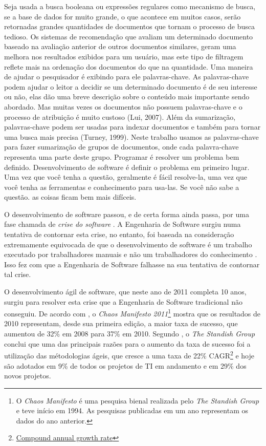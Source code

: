 Seja usada a busca booleana ou expressões regulares como mecanismo de busca, se a base de dados for muito grande, o que acontece em muitos casos, serão retornadas grandes quantidades de documentos que tornam o processo de busca tedioso. Os sistemas de recomendação que avaliam um determinado documento baseado na avaliação anterior de outros documentos similares, geram uma melhora nos resultados exibidos para um usuário, mas este tipo de filtragem reflete mais na ordenação dos documentos do que na quantidade. Uma maneira de ajudar o pesquisador é exibindo para ele palavras-chave.
As palavras-chave podem ajudar o leitor a decidir se um determinado documento é de seu interesse ou não, elas dão uma breve descrição sobre o conteúdo mais importante sendo abordado. Mas muitas vezes os documentos não possuem palavras-chave e o processo de atribuição é muito custoso (Lui, 2007). Além da sumarização, palavras-chave podem ser usadas para indexar documentos e também para tornar uma busca mais precisa (Turney, 1999). Neste trabalho usamos as palavras-chave para fazer sumarização de grupos de documentos, onde cada palavra-chave representa uma parte deste grupo.
Programar é resolver um problema bem definido. Desenvolvimento de software é
definir o problema em primeiro lugar. Uma vez que você tenha a questão,
geralmente é fácil resolve-la, uma vez que você tenha as ferramentas e
conhecimento para usa-las. Se você não sabe a questão. as coisas ficam bem mais
difíceis.
\cite{Doe:2009:Online}

\cite{ProgrammingIsEasySoftwareDevelopmentIsHard}

O desenvolvimento de software passou, e de certa forma ainda passa, por uma fase
chamada de \emph{crise do software} \cite{HumbleProgrammer}. A Engenharia de
Software surgiu \cite{NaurRandell} numa tentativa de contornar esta crise, no
entanto, foi baseada na consideração extremamente equivocada de que o
desenvolvimento de software é um trabalho executado por trabalhadores manuais e
não um trabalhadores do conhecimento \cite[38]{XPTeles}. Isso fez com que a
Engenharia de Software falhasse na sua tentativa de contornar tal crise.

O desenvolvimento ágil de software, que neste ano de 2011 completa 10 anos,
surgiu \cite{AgileManifesto} para resolver esta crise que a Engenharia de
Software tradicional não conseguiu. De acordo com \cite{PMNetworkFailureDrop}, o
\textit{Chaos Manifesto 2011}\footnote{O \textit{Chaos Manifesto} é uma pesquisa
bienal realizada pelo \textit{The Standish Group} e teve início em 1994. As
pesquisas publicadas em um ano representam os dados do ano anterior.} mostra que
os resultados de 2010 representam, desde sua primeira edição, a maior taxa de
sucesso, que aumentou de 32\% em 2008 para 37\% em 2010. Segundo
\cite{ResumoChaosReport}, o \textit{The Standish Group} conclui que uma das
principais razões para o aumento da taxa de sucesso foi a utilização das
métodologias ágeis, que cresce a uma taxa de 22\%
CAGR\footnote{\href{http://en.wikipedia.org/wiki/Compound_annual_growth_rate}
{Compound annual growth rate}} e hoje são adotados em 9\% de todos os projetos
de TI em andamento e em 29\% dos novos projetos.

